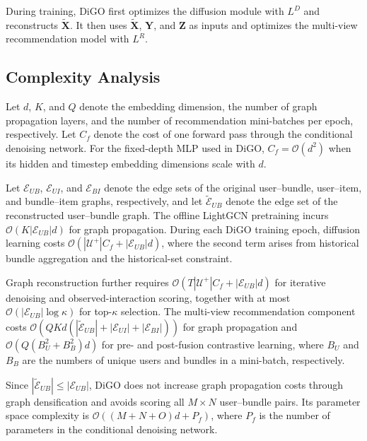 \documentclass[letterpaper]{article}
\begin{document}
During training, DiGO first optimizes the diffusion module with
$L^D$ and reconstructs $\widetilde{\mathbf X}$. It then uses
$\widetilde{\mathbf X}$, $\mathbf Y$, and $\mathbf Z$ as inputs
and optimizes the multi-view recommendation model with $L^R$.


\subsection{Complexity Analysis}

Let $d$, $K$, and $Q$ denote the embedding dimension, the
number of graph propagation layers, and the number of
recommendation mini-batches per epoch, respectively. Let
$C_f$ denote the cost of one forward pass through the
conditional denoising network. For the fixed-depth MLP used in
DiGO, $C_f=\mathcal O(d^2)$ when its hidden and timestep
embedding dimensions scale with $d$.

Let $\mathcal E_{UB}$, $\mathcal E_{UI}$, and
$\mathcal E_{BI}$ denote the edge sets of the original
user--bundle, user--item, and bundle--item graphs, respectively,
and let $\widetilde{\mathcal E}_{UB}$ denote the edge set of the
reconstructed user--bundle graph. The offline LightGCN
pretraining incurs
$\mathcal O(K|\mathcal E_{UB}|d)$ for graph propagation.
During each DiGO training epoch, diffusion learning costs
$\mathcal O(|\mathcal U^{+}|C_f+|\mathcal E_{UB}|d)$, where
the second term arises from historical bundle aggregation and
the historical-set constraint.

Graph reconstruction further requires
$\mathcal O(T|\mathcal U^{+}|C_f+|\mathcal E_{UB}|d)$ for
iterative denoising and observed-interaction scoring, together
with at most
$\mathcal O(|\mathcal E_{UB}|\log\kappa)$ for top-$\kappa$
selection. The multi-view recommendation component costs
$\mathcal O\!\left(
QKd\left(
|\widetilde{\mathcal E}_{UB}|
+
|\mathcal E_{UI}|
+
|\mathcal E_{BI}|
\right)
\right)$
for graph propagation and
$\mathcal O\!\left(Q(B_U^2+B_B^2)d\right)$
for pre- and post-fusion contrastive learning, where $B_U$ and
$B_B$ are the numbers of unique users and bundles in a
mini-batch, respectively.

Since
$|\widetilde{\mathcal E}_{UB}|
\leq
|\mathcal E_{UB}|$,
DiGO does not increase graph propagation costs through graph
densification and avoids scoring all $M\times N$ user--bundle
pairs. Its parameter space complexity is
$\mathcal O((M+N+O)d+P_f)$, where $P_f$ is the number of
parameters in the conditional denoising network.
\end{document}

